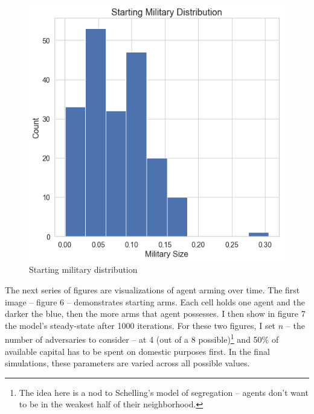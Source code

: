 \documentclass[12pt]{article}
\begin{document}
\begin{figure}
    \centering
    \includegraphics[scale = 0.55]{images/start_mil_hist.png}
    \caption{Starting military distribution}
    \label{startmilhist}
\end{figure}


\doublespacing

The next series of figures are visualizations of agent arming over time. The first image -- figure 6 -- demonstrates starting arms. Each cell holds one agent and the darker the blue, then the more arms that agent possesses. I then show in figure 7 the model's steady-state after 1000 iterations. For these two figures, I set $n$ -- the number of adversaries to consider -- at 4 (out of a 8 possible)\footnote{The idea here is a nod to Schelling's model of segregation -- agents don't want to be in the weakest half of their neighborhood.} and 50\% of available capital has to be spent on domestic purposes first. In the final simulations, these parameters are varied across all possible values. 

\end{document}
